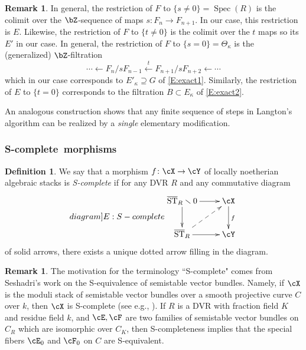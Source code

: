 \documentclass[a4paper]{amsart}
\numberwithin{equation}{section}
\theoremstyle{plain}
\theoremstyle{definition}
\newtheorem{remark}[thm]{Remark}
\newtheorem{defn}[thm]{Definition}
\DeclareMathOperator{\Spec}{Spec}
\DeclareMathOperator{\ST}{ST}
\newcommand{\co}{\colon}
\def\oST{\overline{\ST}}
\def\Scomplete{\textsf{S}-complete}
\begin{document}
\begin{remark}
In general, the restriction of $F$ to $\{s \neq 0\} = \Spec(R)$ is the colimit over the $\bZ$-sequence of maps $s \co F_n \to F_{n+1}$.  In our case, this restriction is $E$.  Likewise, the restriction of $F$ to $\{t \neq 0\}$ is the colimit over the $t$ maps so its $E'$ in our case.
In general, the restriction of $F$ to $\{s = 0\} = \Theta_\kappa$ is the (generalized) $\bZ$-filtration
$$\cdots \leftarrow  F_n / sF_{n-1} \xleftarrow{t} F_{n+1} / sF_{n+2}  \leftarrow \cdots$$
which in our case corresponds to $E'_\kappa \supseteq G$ of \eqref{E:exact1}. Similarly, the restriction of $E$ to $\{t=0\}$ corresponds to the filtration $B \subset E_\kappa$ of \eqref{E:exact2}.  

An analogous construction shows that any finite sequence of steps in Langton's algorithm can be realized by a \emph{single} elementary modification.
\end{remark}



\subsubsection{\Scomplete\ morphisms}

\begin{defn} \label{D:S-complete}
We say that a morphism $f \co \cX \to \cY$ of locally noetherian algebraic stacks is \emph{\Scomplete} if for any DVR $R$ and any commutative diagram
\begin{equation} \label[diagram]{E:S-complete}
\begin{split}
\xymatrix{
\oST_R  \smallsetminus 0 \ar[r] \ar[d]					& \cX \ar[d]^f \\
\oST_R \ar[r] \ar@{-->}[ur]		& \cY
}
\end{split} \end{equation}
of solid arrows, there exists a unique dotted arrow filling in the diagram.
\end{defn}

\begin{remark} The motivation for the terminology ``\Scomplete" comes from Seshadri's work on the {\sf S}-equivalence of semistable vector bundles.  Namely, if $\cX$ is the moduli stack of semistable vector bundles over a smooth projective curve $C$ over $k$, then $\cX$ is {\textsf{S}}-complete (see e.g., ).  If $R$ is a DVR with fraction field $K$ and residue field $k$, and $\cE, \cF$ are two families of semistable vector bundles on $C_R$ which are isomorphic over $C_K$, then {\textsf{S}}-completeness implies that the special fibers $\cE_0$ and $\cF_0$ on $C$ are {\textsf{S}}-equivalent.
\end{remark}
\end{document}
